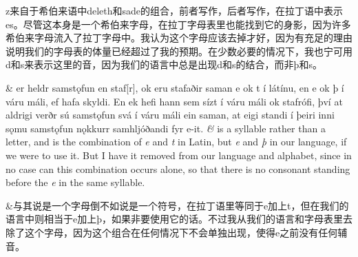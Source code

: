 \begin{translation*}{}
  z来自于希伯来语中deleth和sade的组合，前者写作，后者写作，在拉丁语中表示es。尽管这本身是一个希伯来字母，在拉丁字母表里也能找到它的身影，因为许多希伯来字母流入了拉丁字母中。我认为这个字母应该去掉才好，因为有充足的理由说明我们的字母表的体量已经超过了我的预期。在少数必要的情况下，我也宁可用d和s来表示这里的音，因为我们的语言中总是出现d和s的结合，而非þ和s。
\end{translation*}

\begin{paracol}{2}
  \& er heldr samstǫfun en staf[r], ok eru stafaðir saman e ok t í látínu, en e ok þ í váru máli, ef hafa skyldi. En ek hefi hann sem sízt í váru máli ok stafrófi, því at aldrigi verðr sú samstǫfun svá í váru máli ein saman, at eigi standi í þeiri inni sǫmu samstǫfun nǫkkurr samhljóðandi fyr e-it.
  \switchcolumn
  \textit{\&} is a syllable rather than a letter, and is the combination of \textit{e} and \textit{t} in Latin, but \textit{e} and \textit{þ} in our language, if we were to use it. But I have it removed from our language and alphabet, since in no case can this combination occurs alone, so that there is no consonant standing before the \textit{e} in the same syllable.
\end{paracol}
\begin{translation*}{}
  \&与其说是一个字母倒不如说是一个符号，在拉丁语里等同于e加上t，但在我们的语言中则相当于e加上þ，如果非要使用它的话。不过我从我们的语言和字母表里去除了这个字母，因为这个组合在任何情况下不会单独出现，使得e之前没有任何辅音。
\end{translation*}

